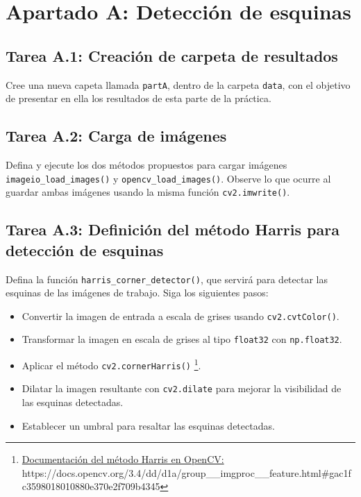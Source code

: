 \chapter{Apartado A: \textbf{Detección de esquinas}}
\label{chapter:tarea_a}


\section*{Tarea A.1: Creación de carpeta de resultados}
{}

Cree una nueva capeta llamada \texttt{partA}, dentro de la carpeta \texttt{data}, con el objetivo de presentar en ella los resultados de esta parte de la práctica.

\section*{Tarea A.2: Carga de imágenes}

Defina y ejecute los dos métodos propuestos para cargar imágenes \texttt{imageio\_load\_images()} y \texttt{opencv\_load\_images()}. Observe lo que ocurre al guardar ambas imágenes usando la misma función \texttt{cv2.imwrite()}.

\section*{Tarea A.3: Definición del método  Harris para detección de esquinas}
Defina la función \texttt{harris\_corner\_detector()}, que servirá para detectar las esquinas de las imágenes de trabajo. Siga los siguientes pasos:

\begin{itemize}
    \item Convertir la imagen de entrada a escala de grises usando \texttt{cv2.cvtColor()}.
    \item Transformar la imagen en escala de grises al tipo \texttt{float32} con \texttt{np.float32}.
    \item Aplicar el método \texttt{cv2.cornerHarris()} \footnote{ \href{https://docs.opencv.org/3.4/dd/d1a/group\_\_imgproc\_\_feature.html\#gac1fc3598018010880e370e2f709b4345}{Documentación del método Harris en OpenCV:} \\{https://docs.opencv.org/3.4/dd/d1a/group\_\_imgproc\_\_feature.html\#gac1fc3598018010880e370e2f709b4345}}.
    \item Dilatar la imagen resultante con \texttt{cv2.dilate} para mejorar la visibilidad de las esquinas detectadas.
    \item Establecer un umbral para resaltar las esquinas detectadas.
\end{itemize}

